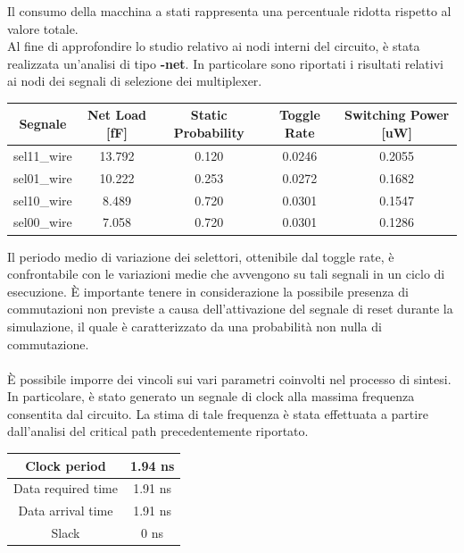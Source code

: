 \documentclass[11pt,  english, makeidx, a4paper, titlepage, oneside]{book}
\begin{document}
\vspace{0.3cm}  
Il consumo della macchina a stati rappresenta una percentuale ridotta rispetto al valore totale.
\\
Al fine di approfondire lo studio relativo ai nodi interni del circuito, è stata realizzata un'analisi di tipo \textbf{-net}. In particolare sono riportati i risultati relativi ai nodi dei segnali di selezione dei multiplexer.
\\
\begin{center}
	\begin{tabular}{|c|c|c|c|c|}
	\hline
	Segnale & Net Load [fF] & Static Probability & Toggle Rate & Switching Power [uW] \\
	\hline
	 sel11\_wire & 13.792  &  0.120  &  0.0246  & 0.2055 \\
	\hline
	 sel01\_wire & 10.222  &  0.253  &  0.0272  & 0.1682 \\
	\hline
	sel10\_wire & 8.489  &  0.720  &  0.0301  & 0.1547\\
	\hline
	sel00\_wire & 7.058  &  0.720  &  0.0301  & 0.1286 \\
	\hline
	\end{tabular}	
\end{center}
\vspace{0.3cm}
Il periodo medio di variazione dei selettori, ottenibile dal toggle rate, è confrontabile con le variazioni medie che avvengono su tali segnali in un ciclo di esecuzione. È importante tenere in considerazione la possibile presenza di commutazioni non previste a causa dell'attivazione del segnale di reset durante la simulazione, il quale è caratterizzato da una probabilità non nulla di commutazione.
\\\\
È possibile imporre dei vincoli sui vari parametri coinvolti nel processo di sintesi. In particolare, è stato generato un segnale di clock alla massima frequenza consentita dal circuito. La stima di tale frequenza è stata effettuata a partire dall'analisi del critical path precedentemente riportato.
\\
\begin{center}
	\begin{tabular}{|c|c|}
	\hline
	Clock period & 1.94 ns\\
	\hline
	Data required time & 1.91 ns \\
	\hline
	Data arrival time & 1.91 ns \\
	\hline
	Slack & 0 ns \\
	\hline
	\end{tabular}	
\end{center}
\end{document}

